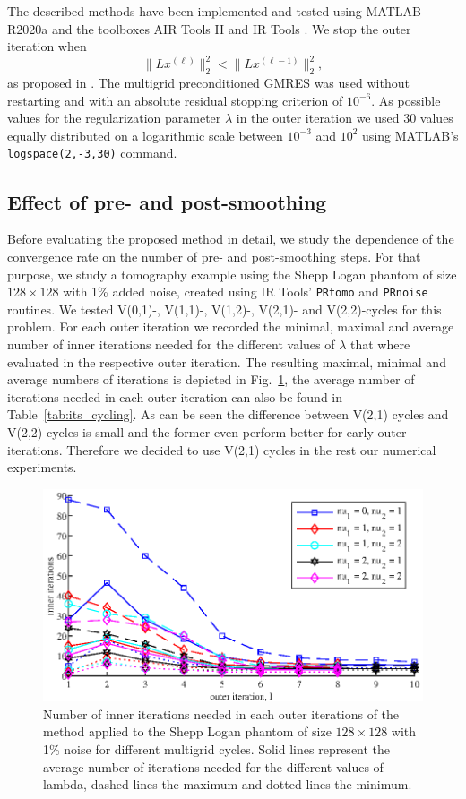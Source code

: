 The described methods have been implemented and tested using MATLAB R2020a and the toolboxes AIR Tools II \cite{art:HANS18} and IR Tools \cite{art:GAZZ19}. We stop the outer iteration when
\[
\|L x^{(\ell)}\|_2^2 < \|L x^{(\ell-1)}\|_2^2,
\]
as proposed in \cite{Gazzola_etal_2020}. The multigrid preconditioned GMRES was used without restarting and with an absolute residual stopping criterion of $10^{-6}$. As possible values for the regularization parameter $\lambda$ in the outer iteration we used 30 values equally distributed on a logarithmic scale between $10^{-3}$ and $10^{2}$ using MATLAB's \texttt{logspace(2,-3,30)} command.

\subsection{Effect of pre- and post-smoothing}
Before evaluating the proposed method in detail, we study the dependence of the convergence rate on the number of pre- and post-smoothing steps. For that purpose, we study a tomography example using the Shepp Logan phantom of size $128 \times 128$ with 1\% added noise, created using IR Tools' \cite{art:GAZZ19} \texttt{PRtomo} and \texttt{PRnoise} routines. We tested V(0,1)-, V(1,1)-, V(1,2)-, V(2,1)- and V(2,2)-cycles for this problem. For each outer iteration we recorded the minimal, maximal and average number of inner iterations needed for the different values of $\lambda$ that where evaluated in the respective outer iteration. The resulting maximal, minimal and average numbers of iterations is depicted in Fig.~\ref{fig:its_cycling}, the average number of iterations needed in each outer iteration can also be found in Table~\ref{tab:its_cycling}. As can be seen the difference between V(2,1) cycles and V(2,2) cycles is small and the former even perform better for early outer iterations. Therefore we decided to use V(2,1) cycles in the rest our numerical experiments.
\begin{figure}[htbp]
\begin{center}
\includegraphics{figures/its_cycling}
\caption{Number of inner iterations needed in each outer iterations of the method applied to the Shepp Logan phantom of size $128 \times 128$ with 1\% noise for different multigrid cycles. Solid lines represent the average number of iterations needed for the different values of lambda, dashed lines the maximum and dotted lines the minimum.}
\label{fig:its_cycling}
\end{center}
\end{figure}
